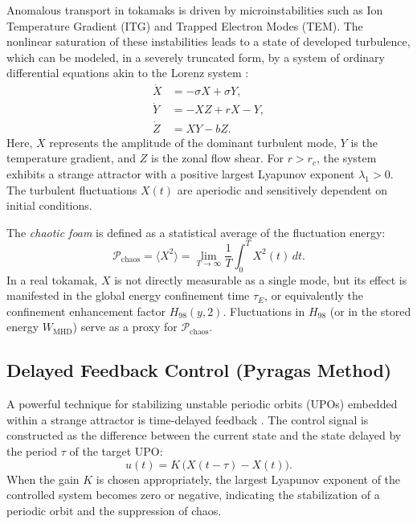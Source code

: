\documentclass[12pt,a4paper]{article}
\begin{document}
Anomalous transport in tokamaks is driven by microinstabilities such as Ion Temperature Gradient (ITG) and Trapped Electron Modes (TEM). The nonlinear saturation of these instabilities leads to a state of developed turbulence, which can be modeled, in a severely truncated form, by a system of ordinary differential equations akin to the Lorenz system \cite{Diamond1994}:
\begin{equation}
\begin{aligned}
\dot{X} &= -\sigma X + \sigma Y, \\
\dot{Y} &= -X Z + r X - Y, \\
\dot{Z} &= X Y - b Z.
\label{eq:lorenz}
\end{aligned}
\end{equation}
Here, $X$ represents the amplitude of the dominant turbulent mode, $Y$ is the temperature gradient, and $Z$ is the zonal flow shear. For $r > r_c$, the system exhibits a strange attractor with a positive largest Lyapunov exponent $\lambda_1 > 0$. The turbulent fluctuations $X(t)$ are aperiodic and sensitively dependent on initial conditions.

The \textit{chaotic foam} is defined as a statistical average of the fluctuation energy:
\begin{equation}
\mathcal{P}_{\text{chaos}} = \langle X^2 \rangle = \lim_{T\to\infty} \frac{1}{T} \int_0^T X^2(t) \, dt.
\label{eq:Pchaos}
\end{equation}
In a real tokamak, $X$ is not directly measurable as a single mode, but its effect is manifested in the global energy confinement time $\tau_E$, or equivalently the confinement enhancement factor $H_{98}(y,2)$. Fluctuations in $H_{98}$ (or in the stored energy $W_{\text{MHD}}$) serve as a proxy for $\mathcal{P}_{\text{chaos}}$.

\subsection{Delayed Feedback Control (Pyragas Method)}

A powerful technique for stabilizing unstable periodic orbits (UPOs) embedded within a strange attractor is time-delayed feedback \cite{Pyragas1992}. The control signal is constructed as the difference between the current state and the state delayed by the period $\tau$ of the target UPO:
\begin{equation}
u(t) = K \, \big( X(t - \tau) - X(t) \big).
\label{eq:pyragas}
\end{equation}
When the gain $K$ is chosen appropriately, the largest Lyapunov exponent of the controlled system becomes zero or negative, indicating the stabilization of a periodic orbit and the suppression of chaos.
\end{document}
